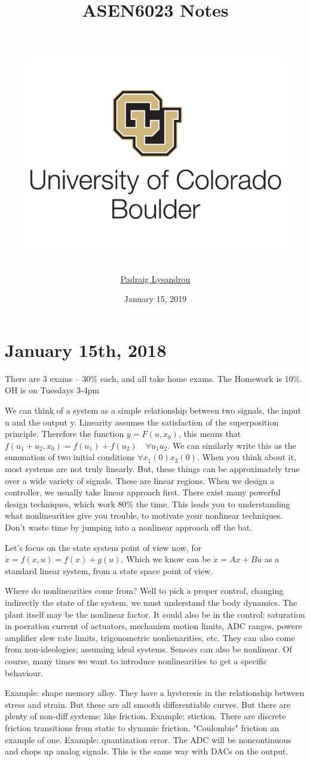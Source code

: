 \documentclass[11pt]{article}
\title{	
    {ASEN6023 Notes}\\
    {\hspace{1cm}}\\
	{\begin{figure}[!htbp]\centering\includegraphics[scale= 0.65]{boulderlogo.jpg}\end{figure}}
    }
\date{January 15, 2019}
\author{\href{mailto:padraig.lysandrou@colorado.edu}{Padraig Lysandrou}}
\begin{document}
\maketitle

\newpage
\section*{January 15th, 2018}
There are 3 exams -- 30\% each, and all take home exams. The Homework is 10\%. OH is on Tuesdays 3-4pm

We can think of a system as a simple relationship between two signals, the input u and the output y. Linearity assumes the satisfaction of the superposition principle. Therefore the function $y=F(u,x_0)$, this means that $f(u_1+u_2,x_0) = f(u_1)+f(u_2) \quad \forall u_1 u_2$. We can similarly write this as the summation of two initial conditions $\forall x_1(0) x_2(0)$. When you think about it, most systems are not truly linearly. But, these things can be approximately true over a wide variety of signals. These are linear regions. When we design a controller, we usually take linear approach first. There exist many powerful design techniques, which work 80\% the time. This leads you to understanding what nonlinearities give you trouble, to motivate your nonlinear techniques. Don't waste time by jumping into a nonlinear approach off the bat. 

Let's focus on the state system point of view now, for $\dot{x} = f(x,u) = f(x) + g(u)$. Which we know can be $\dot{x} = Ax + Bu$ as a standard linear system, from a state space point of view. 

Where do nonlinearities come from?  Well to pick a proper control, changing indirectly the state of the system, we must understand the body dynamics. The plant itself may be the nonlinear factor. It could also be in the control: saturation in poeration current of actuators, mechanism motion limits, ADC ranges, powere amplifier slew rate limits, trigonometric nonlienarities, etc. They can also come from non-ideologies; assuming ideal systems. Sensors can also be nonlinear. Of course, many times we want to introduce nonlinearities to get a specific behaviour. 

Example: shape memory alloy. They have a hysteresis in the relationship between stress and strain. But these are all smooth differentiable curves. But there are plenty of non-diff systems: like friction. Example: stiction. There are discrete friction transitions from static to dynamic friction. "Coulombic" friction an example of one. Example: quantization error. The ADC will be noncontinuous and chops up analog signals. This is the same way with DACs on the output. 
\end{document}
